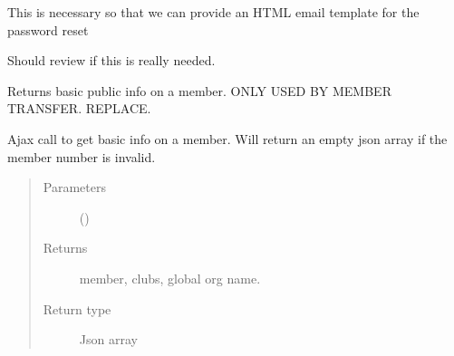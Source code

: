 \documentclass[letterpaper,10pt,english]{sphinxmanual}
\begin{document}

\begin{fulllineitems}
\label{\detokenize{accounts:accounts.views.html_email_reset}}
This is necessary so that we can provide an HTML email template
for the password reset

\end{fulllineitems}


\begin{fulllineitems}
\label{\detokenize{accounts:accounts.views.loggedout}}
Should review if this is really needed.

\end{fulllineitems}


\begin{fulllineitems}
\label{\detokenize{accounts:accounts.views.member_detail_m2m_ajax}}
Returns basic public info on a member. ONLY USED BY MEMBER TRANSFER. REPLACE.

Ajax call to get basic info on a member. Will return an empty json array
if the member number is invalid.
\begin{quote}\begin{description}
\item[{Parameters}] \leavevmode
{} () \textendash{} 

\item[{Returns}] \leavevmode
member, clubs,  global org name.

\item[{Return type}] \leavevmode
Json array

\end{description}\end{quote}

\end{fulllineitems}
\end{document}
